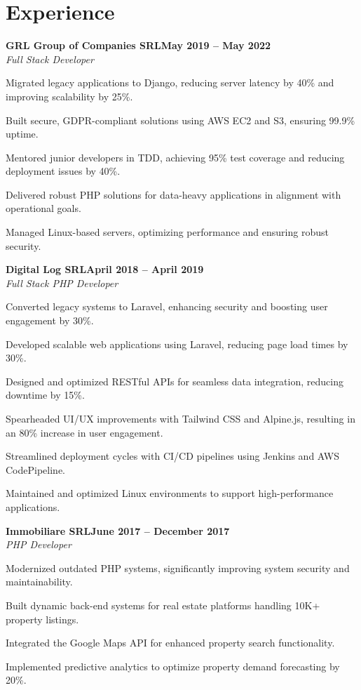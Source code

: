 \documentclass[letterpaper,10pt]{article}
\newcommand{\heading}[2]{
  \hspace{10pt}#1\hfill#2\\
}
\newcommand{\headingBf}[2]{
  \heading{\textbf{#1}}{\textbf{#2}}
}
\newcommand{\headingIt}[2]{
  \heading{\textit{#1}}{\textit{#2}}
}
\newenvironment{resume_list}{
  \vspace{-7pt}
  \begin{itemize}[itemsep=-2px, parsep=1pt, leftmargin=30pt]
}{
  \end{itemize}
}
\begin{document}

  \section{Experience}

  \headingBf{GRL Group of Companies SRL}{May 2019 -- May 2022}
  \headingIt{Full Stack Developer}{}
  \begin{resume_list}
    \item Migrated legacy applications to Django, reducing server latency by 40\% and improving scalability by 25\%.
    \item Built secure, GDPR-compliant solutions using AWS EC2 and S3, ensuring 99.9\% uptime.
    \item Mentored junior developers in TDD, achieving 95\% test coverage and reducing deployment issues by 40\%.
    \item Delivered robust PHP solutions for data-heavy applications in alignment with operational goals.
    \item Managed Linux-based servers, optimizing performance and ensuring robust security.
  \end{resume_list}

  \headingBf{Digital Log SRL}{April 2018 -- April 2019}
  \headingIt{Full Stack PHP Developer}{}
  \begin{resume_list}
    \item Converted legacy systems to Laravel, enhancing security and boosting user engagement by 30\%.
    \item Developed scalable web applications using Laravel, reducing page load times by 30\%.
    \item Designed and optimized RESTful APIs for seamless data integration, reducing downtime by 15\%.
    \item Spearheaded UI/UX improvements with Tailwind CSS and Alpine.js, resulting in an 80\% increase in user engagement.
    \item Streamlined deployment cycles with CI/CD pipelines using Jenkins and AWS CodePipeline.
    \item Maintained and optimized Linux environments to support high-performance applications.
  \end{resume_list}

  \headingBf{Immobiliare SRL}{June 2017 -- December 2017}
  \headingIt{PHP Developer}{}
  \begin{resume_list}
    \item Modernized outdated PHP systems, significantly improving system security and maintainability.
    \item Built dynamic back-end systems for real estate platforms handling 10K+ property listings.
    \item Integrated the Google Maps API for enhanced property search functionality.
    \item Implemented predictive analytics to optimize property demand forecasting by 20\%.
  \end{resume_list}
\end{document}
